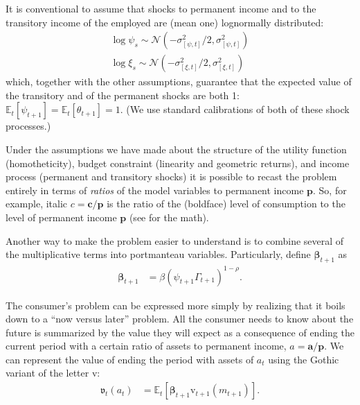 \documentclass{article}
\newcommand{\CRRA}{\rho}
\newcommand{\cLvl}{\mathbf{c}}
\newcommand{\aLvl}{\mathbf{a}}
\newcommand{\Rport}{\mathcal{R}}
\newcommand{\pLvl}{\mathbf{p}}
\newcommand{\DiscFac}{\beta}
\newcommand{\vFunc}{\mathrm{v}}
\newcommand{\Alive}{\mathcal{L}}
\newcommand{\Ex}{\mathbb{E}}
\newcommand{\permGroFac}{\Gamma}
\newcommand{\permShk}{\psi}
\newcommand{\tranShk}{\theta}
\newcommand{\cNrm}{c}
\newcommand{\RNrm}{\mathcal{R}}
\newcommand{\aNrm}{a}
\newcommand{\mNrm}{m}
\begin{document}
It is conventional to assume that shocks to permanent income and to the transitory income of the employed are (mean one) lognormally distributed:
\begin{align}
    \log \permShk_{s} \sim \mathcal{N}(-\sigma_{[\permShk, t]}^{2}/2,\sigma_{[\permShk, t]}^{2})
    \\ \log \xi_{s} \sim \mathcal{N}(-\sigma_{[\xi, t]}^{2}/2,\sigma_{[\xi, t]}^{2})
\end{align}
which, together with the other assumptions, guarantee that the expected value of the transitory and of the permanent shocks are both 1: $\Ex_{t}[\permShk_{t+1}]=\Ex_{t}[\tranShk_{t+1}]=1$.
(We use standard calibrations of both of these shock processes.)

Under the assumptions we have made about the structure of the utility function (homotheticity), budget constraint (linearity and geometric returns), and income process (permanent and transitory shocks) it is possible to recast the problem entirely in terms of \textit{ratios} of the model variables to permanent income $\pLvl$.
So, for example, italic $\cNrm = \cLvl/\pLvl$ is the ratio of the (boldface) level of consumption to the level of permanent income $\pLvl$ (see \cite{BufferStockTheory} for the math).

Another way to make the problem easier to understand is to combine several of the multiplicative terms into portmanteau variables.
Particularly, define $\pmb{\DiscFac}_{t+1}$ as
\begin{align}
     \pmb{\DiscFac}_{t+1} & ={\beta} (\permShk_{t+1} \permGroFac_{t+1})^{1-\CRRA}.
\end{align}


The consumer's problem can be expressed more simply by realizing that it boils down to a ``now versus later'' problem.
All the consumer needs to know about the future is summarized by the value they will expect as a consequence of ending the current period with a certain ratio of assets to permanent income, $\aNrm = \aLvl/\pLvl$.
We can represent the value of ending the period with assets of $\aNrm_t$ using the Gothic variant of the letter $\vFunc$:
\begin{align}
    \mathfrak{v}_{t}(\aNrm_{t}) & = \Ex_{t}[\pmb{\DiscFac}_{t+1}\vFunc_{t+1}(\mNrm_{t+1})].
\end{align}
\end{document}

